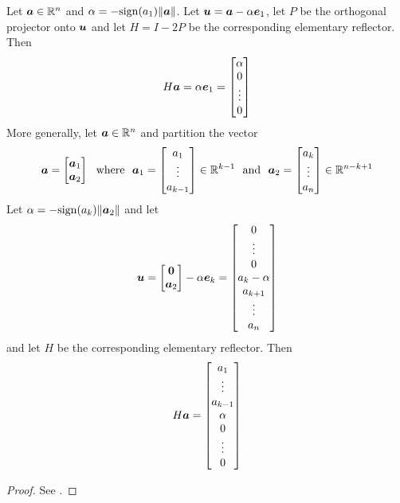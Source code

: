 \begin{proposition}
Let $\boldsymbol{a} \in \mathbb{R}^n$ and $\alpha = -\mathrm{sign}(a_1) \| \boldsymbol{a} \|$. Let  $\boldsymbol{u} = \boldsymbol{a} - \alpha \boldsymbol{e}_1$, let $P$ be the orthogonal projector onto $\boldsymbol{u}$ and let $H = I - 2P$ be the corresponding elementary reflector. Then
$$
H \boldsymbol{a} = \alpha \boldsymbol{e}_1 = \begin{bmatrix} \alpha \\ 0 \\ \vdots \\ 0 \end{bmatrix}
$$
More generally, let $\boldsymbol{a} \in \mathbb{R}^n$ and partition the vector
$$
\bs{a} = \begin{bmatrix} \bs{a}_1 \\ \bs{a}_2 \end{bmatrix}
\ \ \text{where} \ \ 
\bs{a}_1 = \begin{bmatrix} a_1 \\ \vdots \\ a_{k-1} \end{bmatrix} \in \mathbb{R}^{k-1}
 \ \ \text{and} \ \ \bs{a}_2 = \begin{bmatrix} a_k \\ \vdots \\ a_n \end{bmatrix} \in \mathbb{R}^{n-k+1}
$$
Let $\alpha = -\mathrm{sign}(a_k) \| \boldsymbol{a}_2 \|$ and let
$$
\boldsymbol{u} = \begin{bmatrix} \boldsymbol{0} \\ \boldsymbol{a}_2 \end{bmatrix} - \alpha \boldsymbol{e}_k = \begin{bmatrix} 0 \\ \vdots \\ 0 \\ a_k - \alpha \\ a_{k+1} \\ \vdots \\ a_n \end{bmatrix}
$$
and let $H$ be the corresponding elementary reflector. Then
$$
H \boldsymbol{a} = \begin{bmatrix} a_1 \\ \vdots \\ a_{k-1} \\ \alpha \\ 0 \\ \vdots \\ 0 \end{bmatrix}
$$
\begin{proof}
See \cite[p.120]{MH}.
\end{proof}
\end{proposition}

